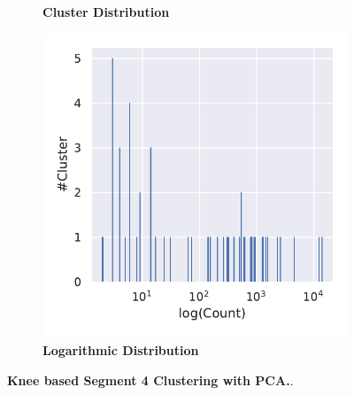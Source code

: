 \begin{figure}
\begin{adjustbox}{minipage=\dimexpr{}\fboxrule,fbox}
\begin{subfigure}[b]{0.475\textwidth}
            \caption[Cluster Distribution]{\textbf{Cluster Distribution}}
            \label{subfig:PCA_Cluster_Kne_Distributione_4}
        \end{subfigure}
        \hfill
        \begin{subfigure}[b]{0.475\textwidth}
            \includegraphics[width=\textwidth]{PCA/Cluster_Distribution_Log_Segment_4.pdf}
            \caption[Logarithmic Distribution]{\textbf{Logarithmic Distribution}}
            \label{subfig:PCA_Cluster_Knee_Distribution_log_4}
        \end{subfigure}
    \end{adjustbox}
    \caption[Knee based Segment 4 Clustering with \Acrshort{PCA}]{\textbf{Knee based Segment 4 Clustering with \Acrshort{PCA}.}.}
    \label{fig:PCA_Cluster_Knee_4}
\end{figure}

